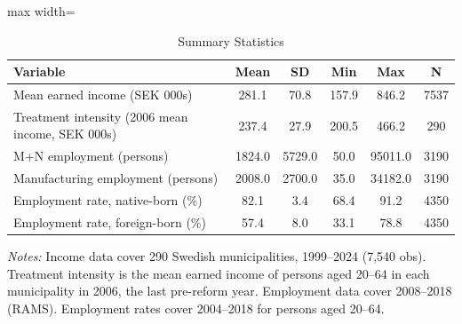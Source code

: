 \begin{table}[htbp]
\centering
\caption{Summary Statistics}
\label{tab:sumstats}
\begin{adjustbox}{max width=\textwidth}
\begin{tabular}{lccccc}
\hline\hline
Variable & Mean & SD & Min & Max & N \\
\hline
Mean earned income (SEK 000s) &  281.1 &   70.8 & 157.9 &   846.2 & 7537 \\
Treatment intensity (2006 mean income, SEK 000s) &  237.4 &   27.9 & 200.5 &   466.2 &  290 \\
M+N employment (persons) & 1824.0 & 5729.0 &  50.0 & 95011.0 & 3190 \\
Manufacturing employment (persons) & 2008.0 & 2700.0 &  35.0 & 34182.0 & 3190 \\
Employment rate, native-born (\%) &   82.1 &    3.4 &  68.4 &    91.2 & 4350 \\
Employment rate, foreign-born (\%) &   57.4 &    8.0 &  33.1 &    78.8 & 4350 \\
\hline\hline
\end{tabular}
\end{adjustbox}
\begin{minipage}{0.95\textwidth}
\vspace{0.3em}\footnotesize
\textit{Notes:} Income data cover 290 Swedish municipalities, 1999--2024 (7,540 obs). Treatment intensity is the mean earned income of persons aged 20--64 in each municipality in 2006, the last pre-reform year. Employment data cover 2008--2018 (RAMS). Employment rates cover 2004--2018 for persons aged 20--64.
\end{minipage}
\end{table}


